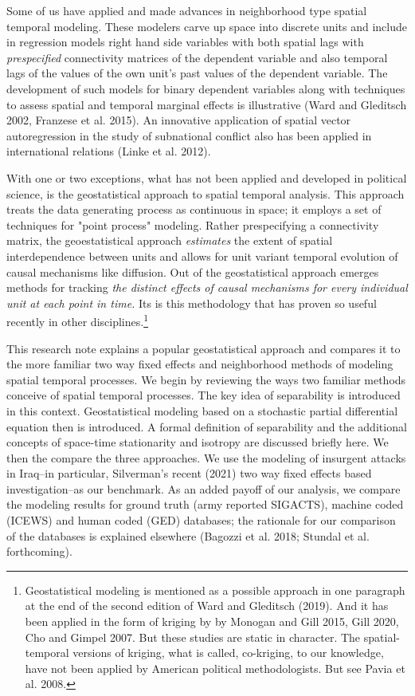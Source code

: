 \documentclass[12pt]{article}
\begin{document}
Some of us have applied and made advances in neighborhood type spatial temporal
modeling. These modelers carve up space into discrete units and include in regression
models right hand side variables with both spatial lags with \emph{prespecified}
connectivity matrices of the dependent variable and also
temporal lags of the values of the own unit's past values
of the dependent variable. The development of such models for binary dependent
variables along with techniques to assess spatial and temporal marginal effects
is illustrative (Ward and Gleditsch 2002, Franzese et al. 2015). An innovative application
of spatial vector autoregression in the study of subnational conflict also has
been applied in international relations (Linke et al. 2012).

With one or two exceptions, what has not been applied and developed in political science,
is the  geostatistical approach to spatial temporal analysis. This approach treats
the data generating process as continuous in space; it employs a set of techniques
for "point process" modeling. Rather prespecifying a connectivity matrix, the
geoestatistical approach \emph{estimates} the extent of spatial interdependence
between units and allows for unit variant temporal evolution of causal mechanisms
like diffusion. Out of the geostatistical approach emerges methods for tracking
\textit {the distinct effects of causal mechanisms for every individual unit at each point
in time.} Its is this methodology that has proven so useful recently in other
disciplines.\footnote{Geostatistical modeling is mentioned as a possible
approach in one paragraph at the end of the second edition of Ward and Gleditsch
(2019). And it has been applied in the form of kriging by
by Monogan and Gill 2015, Gill 2020, Cho and Gimpel 2007. But these studies are
static in character. The spatial-temporal versions of kriging, what is
called, co-kriging, to our knowledge,
have not been applied by American political methodologists. But see
Pavia et al. 2008.}

This research note explains a popular geostatistical approach and compares it to
the more familiar two way fixed effects and neighborhood methods of modeling
spatial temporal processes. We begin by reviewing the ways two familiar
methods conceive of spatial temporal processes. The key idea of
separability is introduced in this context. Geostatistical modeling based
on a stochastic partial differential equation then is introduced.
A formal definition of separability and the additional concepts of
space-time stationarity and isotropy are discussed briefly here.
 We then the compare the three approaches. We
use the modeling of insurgent attacks in Iraq--in particular, Silverman's
recent (2021) two way fixed effects based investigation--as our benchmark.
As an added payoff of our analysis, we compare the modeling results for
ground truth (army reported SIGACTS), machine coded (ICEWS) and human
coded (GED) databases; the rationale for our comparison of the databases
is explained elsewhere (Bagozzi et al. 2018; Stundal et al. forthcoming).
\end{document}
